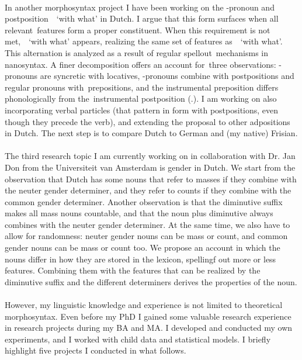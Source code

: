 \documentclass[12pt]{article}
\begin{document}
\phantom{x}\\

In another morphosyntax project I have been working on the -pronoun and postposition  `with what’ in Dutch. I argue that this form surfaces when all relevant features form a proper constituent. When this requirement is not met,  `with what’ appears, realizing the same set of features as  `with what'. This alternation is analyzed as a result of regular spellout mechanisms in nanosyntax. A finer decomposition offers an account for three observations: -pronouns are syncretic with locatives, -pronouns combine with postpositions and regular pronouns with prepositions, and the instrumental preposition differs phonologically from the instrumental postposition (.). I am working on also incorporating verbal particles (that pattern in form with postpositions, even though they precede the verb), and extending the proposal to other adpositions in Dutch. The next step is to compare Dutch to German and (my native) Frisian.\\

\phantom{x}\\

The third research topic I am currently working on in collaboration with Dr. Jan Don from the Universiteit van Amsterdam is gender in Dutch. We start from the observation that Dutch has some nouns that refer to masses if they combine with the neuter gender determiner, and they refer to counts if they combine with the common gender determiner. Another observation is that the diminutive suffix makes all mass nouns countable, and that the noun plus diminutive always combines with the neuter gender determiner. At the same time, we also have to allow for randomness: neuter gender nouns can be mass or count, and common gender nouns can be mass or count too. We propose an account in which the nouns differ in how they are stored in the lexicon, spellingf out more or less features. Combining them with the features that can be realized by the diminutive suffix and the different determiners derives the properties of the noun.\\

\phantom{x}\\

However, my linguistic knowledge and experience is not limited to theoretical morphosyntax. Even before my PhD I gained some valuable research experience in research projects during my BA and MA. I developed and conducted my own experiments, and I worked with child data and statistical models. I briefly highlight five projects I conducted in what follows.\\
\end{document}
